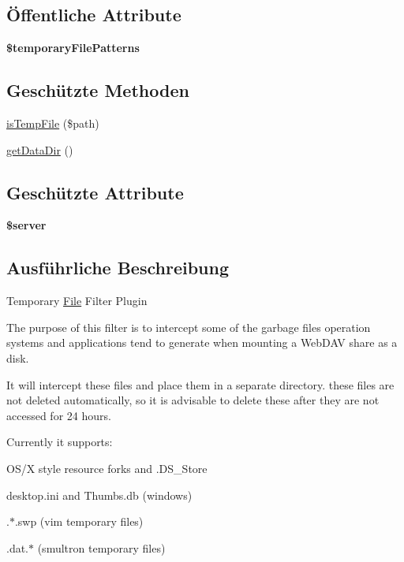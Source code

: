 \subsection*{Öffentliche Attribute}
\begin{DoxyCompactItemize}
\item 
{\bfseries \$temporary\+File\+Patterns}
\end{DoxyCompactItemize}
\subsection*{Geschützte Methoden}
\begin{DoxyCompactItemize}
\item 
\mbox{\hyperlink{class_sabre_1_1_d_a_v_1_1_temporary_file_filter_plugin_a3f82b019bf7484f8c71a4c89c46d3ccf}{is\+Temp\+File}} (\$path)
\item 
\mbox{\hyperlink{class_sabre_1_1_d_a_v_1_1_temporary_file_filter_plugin_ae35ab33945ebc7fb6cdbe8d192cdcc22}{get\+Data\+Dir}} ()
\end{DoxyCompactItemize}
\subsection*{Geschützte Attribute}
\begin{DoxyCompactItemize}
\item 
\mbox{\label{class_sabre_1_1_d_a_v_1_1_temporary_file_filter_plugin_a32eb6ab589d2eb12b3be12c4eccd9d3c}} 
{\bfseries \$server}
\end{DoxyCompactItemize}


\subsection{Ausführliche Beschreibung}
Temporary \mbox{\hyperlink{class_sabre_1_1_d_a_v_1_1_file}{File}} Filter Plugin

The purpose of this filter is to intercept some of the garbage files operation systems and applications tend to generate when mounting a Web\+D\+AV share as a disk.

It will intercept these files and place them in a separate directory. these files are not deleted automatically, so it is advisable to delete these after they are not accessed for 24 hours.

Currently it supports\+:
\begin{DoxyItemize}
\item O\+S/X style resource forks and .D\+S\+\_\+\+Store
\item desktop.\+ini and Thumbs.\+db (windows)
\item .$\ast$.swp (vim temporary files)
\item .dat.$\ast$ (smultron temporary files)
\end{DoxyItemize}

